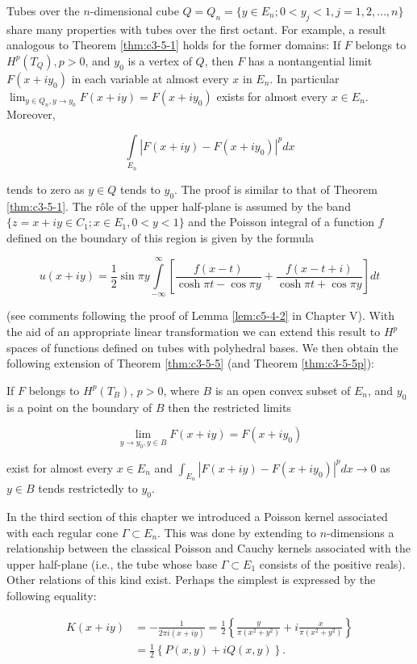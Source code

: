  Tubes over the $n$-dimensional cube $Q = Q_n = \{y \in E_n; 0 < y_j < 1, j = 1, 2, \ldots, n\}$ share many properties with tubes over the first octant. For example, a result analogous to Theorem \ref{thm:c3-5-1} holds for the former domains: If $F$ belongs to $H^p(T_Q), p > 0$, and $y_0$ is a vertex of $Q$, then $F$ has a nontangential limit $F(x + iy_0)$ in each variable at almost every $x$ in $E_n$. In particular $\lim_{y \in Q_n, y \to y_0} F(x + iy) = F(x + iy_0)$ exists for almost every $x \in E_n$. Moreover,

\[
\int\limits_{E_{n}}|F(x+iy)-F(x+iy_{0})|^{p} dx
\]

tends to zero as $y \in Q$ tends to $y_0$. The proof is similar to that of Theorem \ref{thm:c3-5-1}. The rôle of the upper half-plane is assumed by the band $\{z = x + iy \in C_1; x \in E_1, 0 < y < 1\}$ and the Poisson integral of a function $f$ defined on the boundary of this region is given by the formula

\[
u(x+i y)=\textstyle\frac{1}{2}\sin\pi y\int\limits_{-\infty}^{\infty}\left[\frac{f(x-t)}{\cosh\pi t-\cos\pi y}+\frac{f(x-t+i)}{\cosh\pi t+\cos\pi y}\right]d t
\]

(see comments following the proof of Lemma \ref{lem:c5-4-2} in Chapter V). With the aid of an appropriate linear transformation we can extend this result to $H^p$ spaces of functions defined on tubes with polyhedral bases. We then obtain the following extension of Theorem \ref{thm:c3-5-5} (and Theorem \ref{thm:c3-5-5p}):

If $F$ belongs to $H^p(T_B)$, $p > 0$, where $B$ is an open convex subset of $E_n$, and $y_0$ is a point on the boundary of $B$ then the restricted limits

\[
\lim_{y\to y_{0},y\in B}F(x+iy)=F(x+iy_{0})
\]

exist for almost every $x \in E_n$ and $\int_{E_n} |F(x + iy) - F(x + iy_0)|^p dx \to 0$ as $y \in B$ tends restrictedly to $y_0$.

 In the third section of this chapter we introduced a Poisson kernel associated with each regular cone $\Gamma \subset E_n$. This was done by extending to $n$-dimensions a relationship between the classical Poisson and Cauchy kernels associated with the upper half-plane (i.e., the tube whose base $\Gamma \subset E_1$ consists of the positive reals). Other relations of this kind exist. Perhaps the simplest is expressed by the following equality:

\[
\begin{aligned}K(x+iy)&=-\frac{1}{2\pi i(x+iy)}=\frac{1}{2}\left\{\frac{y}{\pi(x^{2}+y^{2})}+i\frac{x}{\pi(x^{2}+y^{2})}\right\}\\&=\frac{1}{2}\left\{P(x,y)+i Q(x,y)\right\}.\end{aligned}
\]

